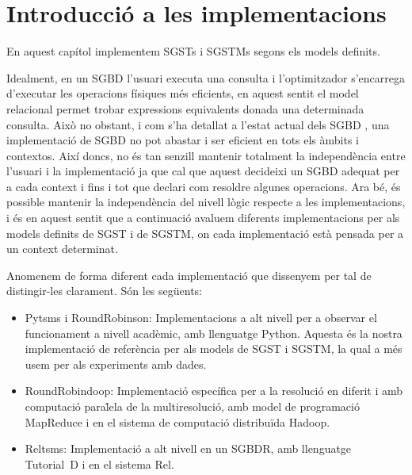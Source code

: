 

\chapter{Introducció a les implementacions}
\label{sec:implementacions}

En aquest capítol implementem \glspl{SGST} i \glspl{SGSTM} segons els
models definits.



Idealment, en un \gls{SGBD} l'usuari executa una consulta i
l'optimitzador s'encarrega d'executar les operacions físiques més
eficients, en aquest sentit el model relacional permet trobar
expressions equivalents donada una determinada consulta. Això no
obstant, i com s'ha detallat a l'estat actual dels \gls{SGBD}
, una implementació de \gls{SGBD} no pot abastar i ser
eficient en tots els àmbits i contextos. Així doncs, no és tan senzill
mantenir totalment la independència entre l'usuari i la implementació
ja que cal que aquest decideixi un \gls{SGBD} adequat per a cada
context i fins i tot que declari com resoldre algunes operacions.  Ara
bé, és possible mantenir la independència del nivell lògic respecte a
les implementacions, i és en aquest sentit que a continuació avaluem
diferents implementacions per als models definits de \gls{SGST} i de
\gls{SGSTM}, on cada implementació està pensada per a un context
determinat.


Anomenem de forma diferent cada implementació que dissenyem per tal de
distingir-les clarament. Són les següents:

\begin{itemize}
\item Pytsms i RoundRobinson: Implementacions a alt nivell per a
  observar el funcionament a nivell acadèmic, amb llenguatge
  Python. Aquesta és la nostra implementació de referència per als
  models de \gls{SGST} i \gls{SGSTM}, la qual a més usem per als
  experiments amb dades.

\item RoundRobindoop: Implementació específica per a la resolució en
  diferit i amb computació para\.lela de la multiresolució, amb model
  de programació MapReduce i en el sistema de computació distribuïda
  Hadoop.

\item Reltsms: Implementació a alt nivell en un \gls{SGBDR}, amb
  llenguatge Tutorial~D i en el sistema Rel.




\end{itemize}




